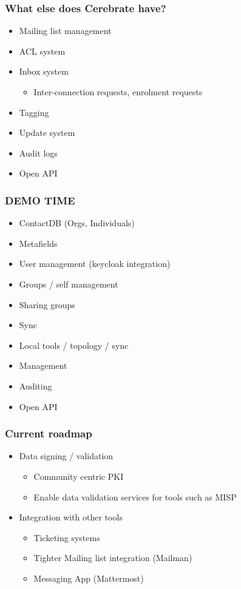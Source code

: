 \begin{frame}
\frametitle{What else does Cerebrate have?}
    \begin{itemize}
        \item Mailing list management
        \item ACL system
        \item Inbox system
        \begin{itemize}
            \item Inter-connection requests, enrolment requests
        \end{itemize}
        \item Tagging
        \item Update system
        \item Audit logs
        \item Open API
    \end{itemize}
\end{frame}

\begin{frame}
\frametitle{DEMO TIME}
    \begin{itemize}
        \item ContactDB (Orgs, Individuals)
        \item Metafields
        \item User management (keycloak integration)
        \item Groups / self management
        \item Sharing groups
        \item Sync
        \item Local tools / topology / sync
        \item Management
        \item Auditing
        \item Open API
    \end{itemize}
\end{frame}



\begin{frame}
\frametitle{Current roadmap}
    \begin{itemize}
        \item Data signing / validation
        \begin{itemize}
            \item Community centric PKI
            \item Enable data validation services for tools such as MISP
        \end{itemize}
        \item Integration with other tools
        \begin{itemize}
            \item Ticketing systems
            \item Tighter Mailing list integration (Mailman)
            \item Messaging App (Mattermost)
        \end{itemize}
    \end{itemize}
\end{frame}
